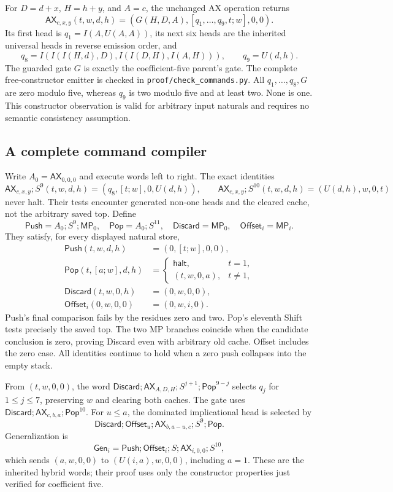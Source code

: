 For $D=d+x$, $H=h+y$, and $A=c$, the unchanged AX operation returns
\[
 \mathsf{AX}_{c,x,y}(t,w,d,h)=
 (G(H,D,A),[q_1,\ldots,q_9,t;w],0,0).
\]
Its first head is $q_1=I(A,U(A,A))$, its next six heads are the inherited
universal heads in reverse emission order, and
\[
 q_8=I(I(I(H,d),D),I(I(D,H),I(A,H))),\qquad q_9=U(d,h).
\]
The guarded gate $G$ is exactly the coefficient-five parent's gate.
The complete free-constructor emitter is checked in
\texttt{proof/check\_commands.py}.  All $q_1,\ldots,q_8,G$ are zero modulo
five, whereas $q_9$ is two modulo five and at least two.  None is one.
This constructor observation is valid for arbitrary input naturals and
requires no semantic consistency assumption.

\subsection{A complete command compiler}

Write $A_0=\mathsf{AX}_{0,0,0}$ and execute words left to right.  The exact
identities
\[
 \mathsf{AX}_{c,x,y};S^9(t,w,d,h)=(q_8,[t;w],0,U(d,h)),\qquad
 \mathsf{AX}_{c,x,y};S^{10}(t,w,d,h)=(U(d,h),w,0,t)
\]
never halt.  Their tests encounter generated non-one heads and the cleared
cache, not the arbitrary saved top.  Define
\[
 \mathsf{Push}=A_0;S^9;\mathsf{MP}_0,\quad
 \mathsf{Pop}=A_0;S^{11},\quad
 \mathsf{Discard}=\mathsf{MP}_0,\quad
 \mathsf{Offset}_i=\mathsf{MP}_i.
\]
They satisfy, for every displayed natural store,
\begin{align*}
 \mathsf{Push}(t,w,d,h)&=(0,[t;w],0,0),\\
 \mathsf{Pop}(t,[a;w],d,h)&=
  \begin{cases}\mathsf{halt},&t=1,\\(t,w,0,a),&t\ne1,\end{cases}\\
 \mathsf{Discard}(t,w,0,h)&=(0,w,0,0),\\
 \mathsf{Offset}_i(0,w,0,0)&=(0,w,i,0).
\end{align*}
Push's final comparison fails by the residues zero and two.  Pop's eleventh
Shift tests precisely the saved top.  The two MP branches coincide when
the candidate conclusion is zero, proving Discard even with arbitrary old
cache.  Offset includes the zero case.  All identities continue to hold
when a zero push collapses into the empty stack.

From $(t,w,0,0)$, the word
$\mathsf{Discard};\mathsf{AX}_{A,D,H};S^{j+1};\mathsf{Pop}^{9-j}$ selects
$q_j$ for $1\le j\le7$, preserving $w$ and clearing both caches.  The gate
uses $\mathsf{Discard};\mathsf{AX}_{c,b,a};\mathsf{Pop}^{10}$.
For $u\le a$, the dominated implicational head is selected by
\[
 \mathsf{Discard};\mathsf{Offset}_u;
 \mathsf{AX}_{b,a-u,c};S^9;\mathsf{Pop}.
\]
Generalization is
\[
 \mathsf{Gen}_i=\mathsf{Push};\mathsf{Offset}_i;S;
                  \mathsf{AX}_{i,0,0};S^{10},
\]
which sends $(a,w,0,0)$ to $(U(i,a),w,0,0)$, including $a=1$.
These are the inherited hybrid words; their proof uses only the constructor
properties just verified for coefficient five.

